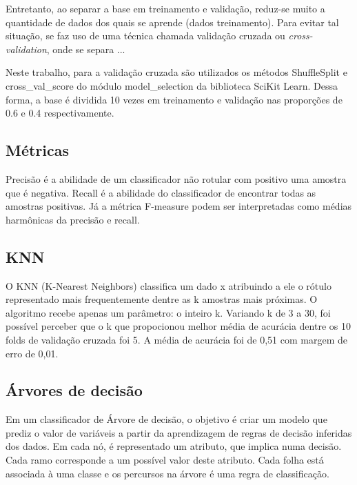\documentclass[conference]{IEEEtran}
\begin{document}
Entretanto, ao separar a base em treinamento e validação, reduz-se muito a
quantidade de dados dos quais se aprende (dados treinamento). Para evitar tal
situação, se faz uso de uma técnica chamada validação cruzada ou
\emph{cross-validation}, onde se separa ...

Neste trabalho, para a validação cruzada são utilizados os métodos ShuffleSplit
e cross\_val\_score do módulo model\_selection da biblioteca SciKit Learn. Dessa
forma, a base é dividida 10 vezes em treinamento e validação nas proporções de
0.6 e 0.4 respectivamente.

\subsection{Métricas}

Precisão é a abilidade de um classificador não rotular com positivo uma amostra
que é negativa. Recall é a abilidade do classificador de encontrar todas as
amostras positivas. Já a métrica F-measure podem ser interpretadas como médias
harmônicas da precisão e recall.


\subsection{KNN}

O KNN (K-Nearest Neighbors) classifica um dado x atribuindo a ele o rótulo
representado mais frequentemente dentre as k amostras mais próximas. O
algoritmo recebe apenas um parâmetro: o inteiro k. Variando k de 3 a 30, foi
possível perceber que o k que propocionou melhor média de acurácia dentre os 10
folds de validação cruzada foi 5. A média de acurácia foi de 0,51 com margem de
erro de 0,01.


%


\subsection{Árvores de decisão}

Em um classificador de Árvore de decisão, o objetivo é criar um modelo que
prediz o valor de variáveis a partir da aprendizagem de regras de decisão
inferidas dos dados. Em cada nó, é representado um atributo, que implica numa
decisão. Cada ramo corresponde a um possível valor deste atributo. Cada folha
está associada à uma classe e os percursos na árvore é uma regra de
classificação.
\end{document}
